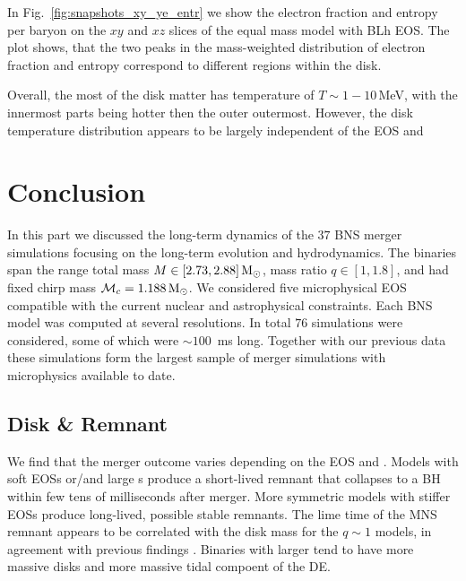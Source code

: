 In Fig.~\ref{fig:snapshots_xy_ye_entr} we show the electron fraction 
and entropy per baryon on the $xy$ and $xz$ slices of the equal 
mass model with BLh \ac{EOS}.
The plot shows, that the two peaks in the mass-weighted distribution 
of electron fraction and entropy correspond to different regions within the disk.

Overall, the most of the disk matter has temperature of $T\sim 1-10\,$MeV, with the innermost parts being hotter then the outer outermost. 
However, the disk temperature distribution appears to be largely independent of the \ac{EOS} and \mr{}




\section{Conclusion}

\citep{Radice:2016rys}

In this part we discussed the long-term dynamics of the $37$ \ac{BNS} merger simulations
focusing on the long-term evolution and hydrodynamics. 
The binaries span the range total mass $M\in[2.73, 2.88]\,{\text{M}_{\odot}}$, 
mass ratio $q\in[1,1.8]$, and had fixed chirp mass $\mathcal{M}_c=1.188\,{\text{M}_{\odot}}$.
We considered five microphysical \ac{EOS} compatible with the current nuclear and
astrophysical constraints. 
Each \ac{BNS} model was computed at several resolutions. 
In total $76$ simulations were considered, some of which were ${\sim}100$~ms 
long. Together with our previous data
\citep{Bernuzzi:2015opx,Radice:2016dwd,Radice:2016rys,Radice:2017lry,Radice:2018xqa,Radice:2018pdn,Perego:2019adq,Endrizzi:2019trv,Bernuzzi:2020txg}
these simulations form the largest sample of merger simulations with microphysics
available to date. 

\subsection{Disk \& Remnant}

We find that the merger outcome varies depending on the \ac{EOS} and \mr{}.
Models with soft \acp{EOS} or/and large \mr{}s produce a short-lived remnant that 
collapses to a \ac{BH} within few tens of milliseconds after merger. 
More symmetric models with stiffer \acp{EOS} produce long-lived, possible 
stable remnants. The lime time of the \ac{MNS} remnant appears to be correlated with the 
disk mass for the $q{\sim}1$ models, in agreement with previous findings 
\citep{Radice:2017lry,Radice:2018pdn}.
Binaries with larger \mr{} tend to have more massive disks and more massive tidal 
compoent of the \ac{DE}.

